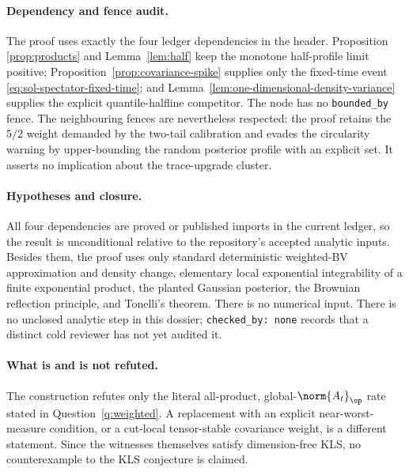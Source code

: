 \documentclass[../main.tex]{subfiles}
\begin{document}
\paragraph{Dependency and fence audit.}
The proof uses exactly the four ledger dependencies in the header.  Proposition
\ref{prop:products} and Lemma~\ref{lem:half} keep the monotone half-profile limit positive;
Proposition~\ref{prop:covariance-spike} supplies only the fixed-time event
\eqref{eq:sol-spectator-fixed-time}; and
Lemma~\ref{lem:one-dimensional-density-variance} supplies the explicit quantile-halfline
competitor.  The node has no \texttt{bounded\_by} fence.  The neighbouring fences are nevertheless
respected: the proof retains the $5/2$ weight demanded by the two-tail calibration and evades
the circularity warning by upper-bounding the random posterior profile with an explicit set.
It asserts no implication about the trace-upgrade cluster.

\paragraph{Hypotheses and closure.}
All four dependencies are proved or published imports in the current ledger, so the result is
unconditional relative to the repository's accepted analytic inputs.  Besides them, the proof
uses only standard deterministic weighted-BV approximation and density change, elementary local
exponential integrability of a finite exponential product, the planted Gaussian posterior,
the Brownian reflection principle, and Tonelli's theorem.  There is no numerical input.  There
is no unclosed analytic step in this dossier; \texttt{checked\_by: none} records that a distinct
cold reviewer has not yet audited it.

\paragraph{What is and is not refuted.}
The construction refutes only the literal all-product, global-$\norm{A_t}_\op$ rate stated in
Question~\ref{q:weighted}.  A replacement with an explicit near-worst-measure condition, or a
cut-local tensor-stable covariance weight, is a different statement.  Since the witnesses
themselves satisfy dimension-free KLS, no counterexample to the KLS conjecture is claimed.
\end{document}
